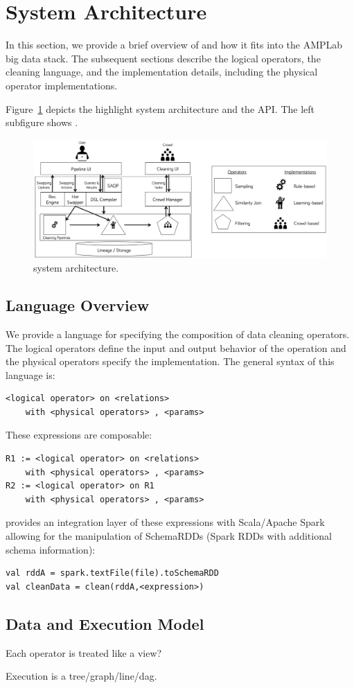 \section{System Architecture}

In this section, we provide a brief overview of \sys and how it fits into
the AMPLab big data stack.
The subsequent sections describe the logical operators, the cleaning language,
and the implementation details, including the physical operator implementations.

Figure~\ref{fig:arch} depicts the highlight system architecture and the API. 
The left subfigure shows .

  \begin{figure}[ht]
  \centering
  \includegraphics[width = \textwidth]{figs/architecture.png}
  \caption{\sys system architecture.}
  \label{fig:arch}
  \end{figure}


\subsection{Language Overview}
We provide a language for specifying the composition of data cleaning operators.
The logical operators define the input and output behavior of the operation and 
the physical operators specify the implementation.
The general syntax of this language is:
\begin{lstlisting}
<logical operator> on <relations>
	with <physical operators> , <params>
\end{lstlisting}
These expressions are composable:
\begin{lstlisting}
R1 := <logical operator> on <relations> 
	with <physical operators> , <params>
R2 := <logical operator> on R1 
	with <physical operators> , <params>
\end{lstlisting}
\projx provides an integration layer of these expressions with Scala/Apache Spark allowing for the manipulation of SchemaRDDs (Spark RDDs with additional schema information):
\begin{lstlisting}
val rddA = spark.textFile(file).toSchemaRDD
val cleanData = clean(rddA,<expression>)
\end{lstlisting}


\subsection{Data and Execution Model}


Each operator is treated like a view?

Execution is a tree/graph/line/dag.


